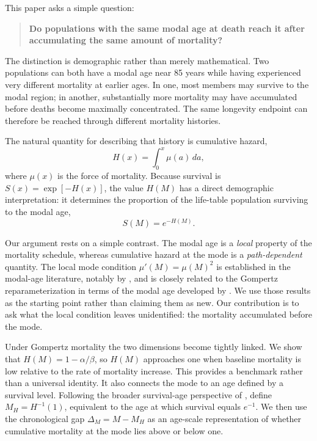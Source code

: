 \documentclass[doublespace]{interact}
\begin{document}
This paper asks a simple question:

\begin{quote}
\textbf{Do populations with the same modal age at death reach it after accumulating the same amount of mortality?}
\end{quote}

The distinction is demographic rather than merely mathematical. Two populations can both have a modal age near 85 years while having experienced very different mortality at earlier ages. In one, most members may survive to the modal region; in another, substantially more mortality may have accumulated before deaths become maximally concentrated. The same longevity endpoint can therefore be reached through different mortality histories.

The natural quantity for describing that history is cumulative hazard,
\begin{equation}
H(x)=\int_0^x \mu(a)\,da,
\end{equation}
where $\mu(x)$ is the force of mortality. Because survival is $S(x)=\exp[-H(x)]$, the value $H(M)$ has a direct demographic interpretation: it determines the proportion of the life-table population surviving to the modal age,
\begin{equation}
S(M)=e^{-H(M)}.
\end{equation}

Our argument rests on a simple contrast. The modal age is a \emph{local} property of the mortality schedule, whereas cumulative hazard at the mode is a \emph{path-dependent} quantity. The local mode condition $\mu'(M)=\mu(M)^2$ is established in the modal-age literature, notably by \citet{CanudasRomo2008}, and is closely related to the Gompertz reparameterization in terms of the modal age developed by \citet{MissovEtAl2015}. We use those results as the starting point rather than claiming them as new. Our contribution is to ask what the local condition leaves unidentified: the mortality accumulated before the mode.

Under Gompertz mortality the two dimensions become tightly linked. We show that $H(M)=1-\alpha/\beta$, so $H(M)$ approaches one when baseline mortality is low relative to the rate of mortality increase. This provides a benchmark rather than a universal identity. It also connects the mode to an age defined by a survival level. Following the broader survival-age perspective of \citet{AlvarezVaupel2023}, define $M_H=H^{-1}(1)$, equivalent to the age at which survival equals $e^{-1}$. We then use the chronological gap $\Delta_M=M-M_H$ as an age-scale representation of whether cumulative mortality at the mode lies above or below one.
\end{document}
